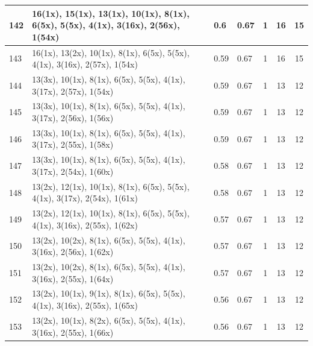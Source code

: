 \begin{small}
\begin{longtable}{|p{0.5cm}|p{9cm}|p{1.3cm}|p{1.3cm}|c|c|c|}
  142 & 16(1x), 15(1x), 13(1x), 10(1x), 8(1x), 6(5x), 5(5x), 4(1x), 3(16x), 2(56x), 1(54x) & \cellcolor{colorOK}  0.6 & \cellcolor{colorOK} 0.67 & 1 & 16 & \cellcolor{colorBad} 15 \\   \hline
  143 & 16(1x), 13(2x), 10(1x), 8(1x), 6(5x), 5(5x), 4(1x), 3(16x), 2(57x), 1(54x) & \cellcolor{colorOK}  0.59 & \cellcolor{colorOK} 0.67 & 1 & 16 & \cellcolor{colorBad} 15 \\   \hline
  144 & 13(3x), 10(1x), 8(1x), 6(5x), 5(5x), 4(1x), 3(17x), 2(57x), 1(54x) & \cellcolor{colorOK}  0.59 & \cellcolor{colorOK} 0.67 & 1 & 13 & \cellcolor{colorGood} 12 \\   \hline
  145 & 13(3x), 10(1x), 8(1x), 6(5x), 5(5x), 4(1x), 3(17x), 2(56x), 1(56x) & \cellcolor{colorOK}  0.59 & \cellcolor{colorOK} 0.67 & 1 & 13 & \cellcolor{colorGood} 12 \\   \hline
  146 & 13(3x), 10(1x), 8(1x), 6(5x), 5(5x), 4(1x), 3(17x), 2(55x), 1(58x) & \cellcolor{colorOK}  0.59 & \cellcolor{colorOK} 0.67 & 1 & 13 & \cellcolor{colorGood} 12 \\   \hline
  147 & 13(3x), 10(1x), 8(1x), 6(5x), 5(5x), 4(1x), 3(17x), 2(54x), 1(60x) & \cellcolor{colorOK}  0.58 & \cellcolor{colorOK} 0.67 & 1 & 13 & \cellcolor{colorGood} 12 \\   \hline
  148 & 13(2x), 12(1x), 10(1x), 8(1x), 6(5x), 5(5x), 4(1x), 3(17x), 2(54x), 1(61x) & \cellcolor{colorOK}  0.58 & \cellcolor{colorOK} 0.67 & 1 & 13 & \cellcolor{colorGood} 12 \\   \hline
  149 & 13(2x), 12(1x), 10(1x), 8(1x), 6(5x), 5(5x), 4(1x), 3(16x), 2(55x), 1(62x) & \cellcolor{colorOK}  0.57 & \cellcolor{colorOK} 0.67 & 1 & 13 & \cellcolor{colorGood} 12 \\   \hline
  150 & 13(2x), 10(2x), 8(1x), 6(5x), 5(5x), 4(1x), 3(16x), 2(56x), 1(62x) & \cellcolor{colorOK}  0.57 & \cellcolor{colorOK} 0.67 & 1 & 13 & \cellcolor{colorGood} 12 \\   \hline
  151 & 13(2x), 10(2x), 8(1x), 6(5x), 5(5x), 4(1x), 3(16x), 2(55x), 1(64x) & \cellcolor{colorOK}  0.57 & \cellcolor{colorOK} 0.67 & 1 & 13 & \cellcolor{colorGood} 12 \\   \hline
  152 & 13(2x), 10(1x), 9(1x), 8(1x), 6(5x), 5(5x), 4(1x), 3(16x), 2(55x), 1(65x) & \cellcolor{colorOK}  0.56 & \cellcolor{colorOK} 0.67 & 1 & 13 & \cellcolor{colorGood} 12 \\   \hline
  153 & 13(2x), 10(1x), 8(2x), 6(5x), 5(5x), 4(1x), 3(16x), 2(55x), 1(66x) & \cellcolor{colorOK}  0.56 & \cellcolor{colorOK} 0.67 & 1 & 13 & \cellcolor{colorGood} 12 \\   \hline

\end{longtable}
\end{small}
